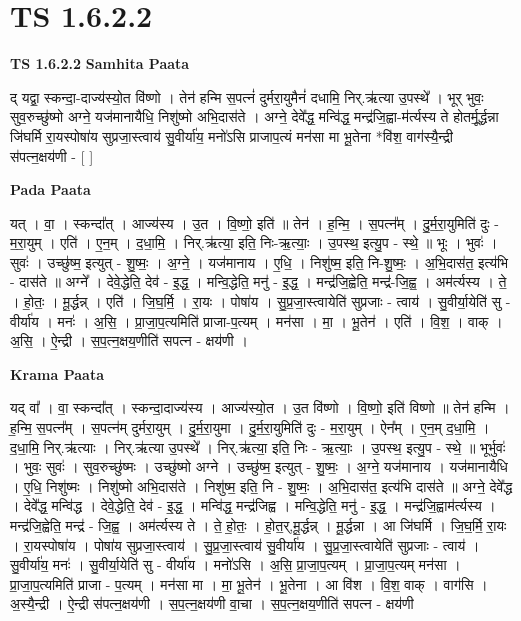 \documentclass[17pt]{extarticle}
\begin{document}
\section{ TS 1.6.2.2 }

\textbf{TS 1.6.2.2 } \newline
\textbf{Samhita Paata} \newline

द् यद्वा॒ स्कन्दा॒-दाज्य॑स्यो॒त वि॑ष्णो । तेन॑ हन्मि स॒पत्नं॑ दुर्मरा॒युमैनं॑ दधामि॒ निर्.ऋ॑त्या उ॒पस्थे᳚ । भूर् भुवः॒ सुव॒रुच्छु॑ष्मो अग्ने॒ यज॑मानायैधि॒ निशु॑ष्मो अभि॒दास॑ते । अग्ने॒ देवे᳚द्ध॒ मन्वि॑द्ध॒ मन्द्र॑जि॒ह्वा-म॑र्त्यस्य ते होतर्मू॒र्द्धन्ना जि॑घर्मि रा॒यस्पोषा॑य सुप्रजा॒स्त्वाय॑ सु॒वीर्या॑य॒ मनो॑ऽसि प्राजाप॒त्यं मन॑सा मा भू॒तेना *वि॑श॒ वाग॑स्यै॒न्द्री स॑पत्न॒क्षय॑णी - [ ] \newline

\textbf{Pada Paata} \newline

यत् । वा॒ । स्कन्दा᳚त् । आज्य॑स्य । उ॒त । वि॒ष्णो॒ इति॑ ॥ तेन॑ । ह॒न्मि॒ । स॒पत्न᳚म् । दु॒र्म॒रा॒युमिति॑ दुः - म॒रा॒युम् । एति॑ । ए॒न॒म् । द॒धा॒मि॒ । निर्.ऋ॑त्या॒ इति॒ निः-ऋ॒त्याः॒ । उ॒पस्थ॒ इत्यु॒प - स्थे॒ ॥ भूः । भुवः॑ । सुवः॑ । उच्छु॑ष्म॒ इत्युत् - शु॒ष्मः॒ । अ॒ग्ने॒ । यज॑मानाय । ए॒धि॒ । निशु॑ष्म॒ इति॒ नि-शु॒ष्मः॒ । अ॒भि॒दास॑त॒ इत्य॑भि - दास॑ते ॥ अग्ने᳚ । देवे॒द्धेति॒ देव॑ - इ॒द्ध॒ । मन्वि॒द्धेति॒ मनु॑ - इ॒द्ध॒ । मन्द्र॑जि॒ह्वेति॒ मन्द्र॑-जि॒ह्व॒ । अम॑र्त्यस्य । ते॒ । हो॒तः॒ । मू॒र्द्धन्न् । एति॑ । जि॒घ॒र्मि॒ । रा॒यः । पोषा॑य । सु॒प्र॒जा॒स्त्वायेति॑ सुप्रजाः - त्वाय॑ । सु॒वीर्या॒येति॑ सु - वीर्या॑य । मनः॑ । अ॒सि॒ । प्रा॒जा॒प॒त्यमिति॑ प्राजा-प॒त्यम् । मन॑सा । मा॒ । भू॒तेन॑ । एति॑ । वि॒श॒ । वाक् । अ॒सि॒ । ऐ॒न्द्री । स॒प॒त्न॒क्षय॒णीति॑ सपत्न - क्षय॑णी ।  \newline


\textbf{Krama Paata} \newline

यद् वा᳚ । वा॒ स्कन्दा᳚त् । स्कन्दा॒दाज्य॑स्य । आज्य॑स्यो॒त । उ॒त वि॑ष्णो । वि॒ष्णो॒ इति॑ विष्णो ॥ तेन॑ हन्मि । ह॒न्मि॒ स॒पत्न᳚म् । स॒पत्न॑म् दुर्मरा॒युम् । दु॒र्म॒रा॒युमा । दु॒र्म॒रा॒युमिति॑ दुः - म॒रा॒युम् । ऐन᳚म् । ए॒न॒म् द॒धा॒मि॒ । द॒धा॒मि॒ निर्.ऋ॑त्याः । निर्.ऋ॑त्या उ॒पस्थे᳚ । निर्.ऋ॑त्या॒ इति॒ निः - ऋ॒त्याः॒ । उ॒पस्थ॒ इत्यु॒प - स्थे॒ ॥ भूर्भुवः॑ । भुवः॒ सुवः॑ । सुव॒रुच्छु॑ष्मः । उच्छु॑ष्मो अग्ने । उच्छु॑ष्म॒ इत्युत् - शु॒ष्मः॒ । अ॒ग्ने॒ यज॑मानाय । यज॑मानायैधि । ए॒धि॒ निशु॑ष्मः । निशु॑ष्मो अभि॒दास॑ते । निशु॑ष्म॒ इति॒ नि - शु॒ष्मः॒ । अ॒भि॒दास॑त॒ इत्य॑भि दास॑ते ॥ अग्ने॒ देवे᳚द्ध । देवे᳚द्ध॒ मन्वि॑द्ध । देवे॒द्धेति॒ देव॑ - इ॒द्ध॒ । मन्वि॑द्ध॒ मन्द्र॑जिह्व । मन्वि॒द्धेति॒ मनु॑ - इ॒द्ध॒ । 
मन्द्र॑जि॒ह्वाम॑र्त्यस्य । मन्द्र॑जि॒ह्वेति॒ मन्द्र॑ - जि॒ह्व॒ । अम॑र्त्यस्य ते । ते॒ हो॒तः॒ । हो॒त॒र्,मू॒र्द्धन्न् । मू॒र्द्धन्ना । आ जि॑घर्मि । जि॒घ॒र्मि॒ रा॒यः । रा॒यस्पोषा॑य । पोषा॑य सुप्रजा॒स्त्वाय॑ । सु॒प्र॒जा॒स्त्वाय॑ सु॒वीर्या॑य । सु॒प्र॒जा॒स्त्वायेति॑ सुप्रजाः - त्वाय॑ । सु॒वीर्या॑य॒ मनः॑ । सु॒वीर्या॒येति॑ सु - वीर्या॑य । मनो॑ऽसि । अ॒सि॒ प्रा॒जा॒प॒त्यम् । प्रा॒जा॒प॒त्यम् मन॑सा । प्रा॒जा॒प॒त्यमिति॑ प्राजा - प॒त्यम् । मन॑सा मा । मा॒ भू॒तेन॑ । भू॒तेना । आ वि॑श । वि॒श॒ वाक् । वाग॑सि । अ॒स्यै॒न्द्री । ऐ॒न्द्री स॑पत्न॒क्षय॑णी । स॒प॒त्न॒क्षय॑णी वा॒चा । स॒प॒त्न॒क्षय॒णीति॑ सपत्न - क्षय॑णी \newline
\end{document}
